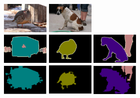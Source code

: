 \begin{figure}[h!]
\begin{subfigure}{0.4\textwidth}
		\includegraphics[width=0.25\textwidth]{image/chap04/result/compare/2007_003349.jpg}
		\includegraphics[width=0.25\textwidth]{image/chap04/result/compare/2009_004507.jpg} 
		\\
		\includegraphics[width=0.25\textwidth]{image/chap04/result/compare/2010_005284.png}
		\includegraphics[width=0.25\textwidth]{image/chap04/result/compare/2007_003349.png}
		\includegraphics[width=0.25\textwidth]{image/chap04/result/compare/2009_004507.png} \\
		\includegraphics[width=0.25\textwidth]{image/chap04/result/compare/zoom_bus.png}
		\includegraphics[width=0.25\textwidth]{image/chap04/result/compare/zoom_bird.png}
		\includegraphics[width=0.25\textwidth]{image/chap04/result/compare/zoom_dog.png} \\

\end{subfigure}
\end{figure}
